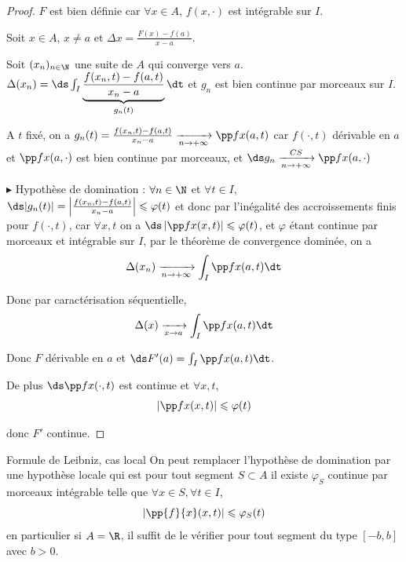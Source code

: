 \begin{proof}
    $F$ est bien définie car $\forall x \in A$, $f(x, \cdot)$ est intégrable sur $I$.

    Soit $x \in A$, $x \neq a$ et $\Delta x = \frac{F(x) - f(a)}{x - a }$.

    Soit $(x_n)_{n \in \N}$ une suite de $A$ qui converge vers $a$. 
    $\Delta(x_n) = \ds \int_I \underbrace{\frac{f(x_n, t) - f(a, t)}{x_n - a }}_{g_n(t)} \dt$
    et $g_n$ est bien continue par morceaux sur $I$. 

    A $t$ fixé, on a $g_n(t) = \frac{f(x_n, t) - f(a, t)}{x_n - a } \xrightarrow[n \to + \infty]{} \pp f x (a, t)$
    car $f(\cdot, t)$ dérivable en $a$ et $\pp f x (a, \cdot)$ est bien continue par morceaux, et $ \ds g_n \xrightarrow[n \to + \infty]{CS} \pp f x (a, \cdot)$


    \avspace $\blacktriangleright$ Hypothèse de domination : $\forall n \in \N$ et $\forall t \in I$, 
    $\ds |g_n(t)| = \left| \frac{f(x_n, t) - f(a, t)}{x_n - a } \right| \leqslant \varphi(t)$ et 
    donc par l'inégalité des accroissements finis pour $f(\cdot, t)$, car $\forall x, t$ on a $\ds \left| \pp f x (x, t) \right| \leqslant \varphi(t)$, 
    et $\varphi$ étant continue par morceaux et intégrable sur $I$, par le théorème de convergence dominée, on a
    $$\Delta(x_n) \xrightarrow[n \to + \infty]{} \int_I \pp f x (a, t) \dt$$

    Donc par caractérisation séquentielle, 
    $$\Delta(x) \xrightarrow[x \to a]{} \int_I \pp f x (a, t) \dt$$

    Donc $F$ dérivable en $a$ et $\ds F'(a) = \int_I \pp f x (a, t) \dt$.

    De plus $\ds \pp f x (\cdot, t)$ est continue et $\forall x, t$, 
    $$\left| \pp f x (x, t) \right| \leqslant \varphi(t)$$

    donc $F'$ continue. 
\end{proof}

\begin{theoreme}{Formule de Leibniz, cas local}{}
    On peut remplacer l'hypothèse de domination par une hypothèse locale qui est pour tout segment 
    $S \subset A$ il existe $\varphi_S$ continue par morceaux intégrable telle que 
    $\forall x \in S, \forall t \in I$,
    $$\left| \pp{f}{x} (x, t) \right| \leqslant \varphi_S(t)$$
    en particulier si $A = \R$, il suffit de le vérifier pour tout segment du type $[-b, b]$ avec $b > 0$.
\end{theoreme}

